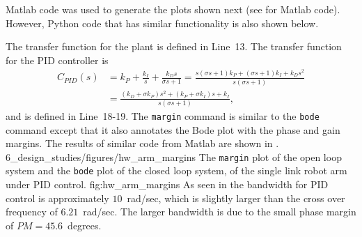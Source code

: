 
Matlab code was used to generate the plots shown next (see  for Matlab code). However, Python code that has similar functionality is also shown below.



%

The transfer function for the plant is defined in Line~13.  The transfer function for the PID controller is
\begin{align*}
C_{PID}(s) &= k_P + \frac{k_I}{s} + \frac{k_D s}{\sigma s + 1} 
           = \frac{s(\sigma s+1)k_P + (\sigma s + 1)k_I + k_D s^2}{s(\sigma s + 1)} \\
           &= \frac{(k_D+\sigma k_P)s^2 + (k_P+\sigma k_I)s + k_I}{s(\sigma s + 1)},
\end{align*}
and is defined in Line~18-19.  The {\tt margin} command is similar to the {\tt bode} command except that it also annotates the Bode plot with the phase and gain margins. The results of similar code from Matlab are shown in .
	{6_design_studies/figures/hw_arm_margins}
	{The {\tt margin} plot of the open loop system and the {\tt bode} plot of the closed loop system, of the single link robot arm under PID control.}
	{fig:hw_arm_margins}
As seen in  the bandwidth for PID control is approximately $10$~rad/sec, which is slightly larger than the cross over frequency of $6.21$~rad/sec.  The larger bandwidth is due to the small phase margin of $PM=45.6$~degrees.

